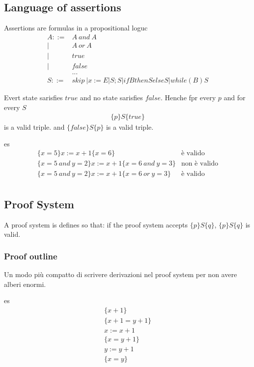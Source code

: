 \documentclass{article}
\begin{document}
\subsection{Language of assertions}
Assertions are formulas in a propositional loguc
\begin{align*}
    A ::=& A\ and\ A \\
         |& A\ or\ A \\
         |& true \\
         |& false \\
         & ... \\
    S ::= & skip\ |x:=E | S;S| if B then S else S | while (B) S
\end{align*}

Evert state sarisfies $true$ and no state sarisfies $false$. Henche fpr every $p$ and for every $S$
\begin{align*}
    \{p\} S \{true\}
\end{align*}
is a valid triple. and $\{false\} S \{p\}$ is a valid triple.

\begin{esempio}{es}
    \[\begin{array}{cl}
        \{x=5\}x:=x+1\{x=6\} & \text{è valido} \\
        \{x=5\ and\ y=2\}x:=x+1\{x=6\ and\ y=3\} & \text{non è valido} \\
        \{x=5\ and\ y=2\}x:=x+1\{x=6\ or\ y=3\} & \text{è valido} \\
    \end{array}\]
\end{esempio}

\subsection{Proof System}
A proof system is defines so that: if the proof system accepts $\{p\}S\{q\}$, $\{p\}S\{q\}$ is valid.
\subsubsection{Proof outline}
Un modo più compatto di scrivere derivazioni nel proof system per non avere alberi enormi.

\begin{esempio}{es}
\[\begin{array}{c}
    \{x+1\} \\
    \{x+1=y+1\} \\
    x:=x+1 \\
    \{x=y+1\} \\
    y:=y+1 \\
    \{x=y\}
\end{array}\] 
\end{esempio}
\end{document}
